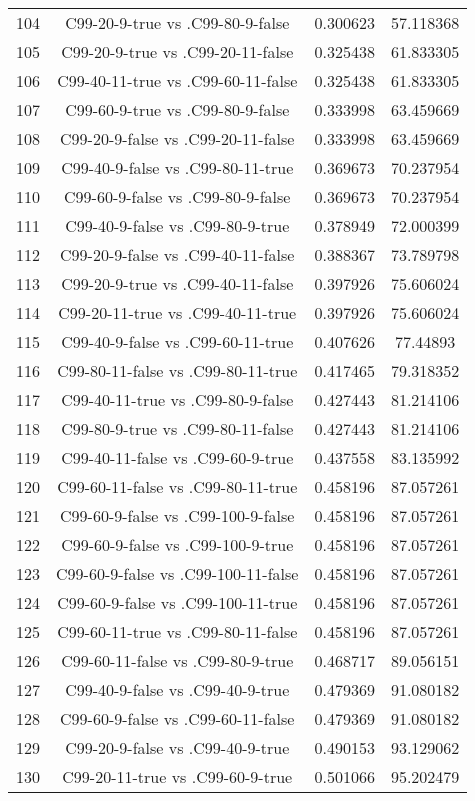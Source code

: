 \documentclass[a4paper,10pt]{article}
\begin{document}
\begin{landscape}
\begin{table}[!htp]
\begin{tabular}{cccc}
104&C99-20-9-true vs .C99-80-9-false&0.300623&57.118368\\
105&C99-20-9-true vs .C99-20-11-false&0.325438&61.833305\\
106&C99-40-11-true vs .C99-60-11-false&0.325438&61.833305\\
107&C99-60-9-true vs .C99-80-9-false&0.333998&63.459669\\
108&C99-20-9-false vs .C99-20-11-false&0.333998&63.459669\\
109&C99-40-9-false vs .C99-80-11-true&0.369673&70.237954\\
110&C99-60-9-false vs .C99-80-9-false&0.369673&70.237954\\
111&C99-40-9-false vs .C99-80-9-true&0.378949&72.000399\\
112&C99-20-9-false vs .C99-40-11-false&0.388367&73.789798\\
113&C99-20-9-true vs .C99-40-11-false&0.397926&75.606024\\
114&C99-20-11-true vs .C99-40-11-true&0.397926&75.606024\\
115&C99-40-9-false vs .C99-60-11-true&0.407626&77.44893\\
116&C99-80-11-false vs .C99-80-11-true&0.417465&79.318352\\
117&C99-40-11-true vs .C99-80-9-false&0.427443&81.214106\\
118&C99-80-9-true vs .C99-80-11-false&0.427443&81.214106\\
119&C99-40-11-false vs .C99-60-9-true&0.437558&83.135992\\
120&C99-60-11-false vs .C99-80-11-true&0.458196&87.057261\\
121&C99-60-9-false vs .C99-100-9-false&0.458196&87.057261\\
122&C99-60-9-false vs .C99-100-9-true&0.458196&87.057261\\
123&C99-60-9-false vs .C99-100-11-false&0.458196&87.057261\\
124&C99-60-9-false vs .C99-100-11-true&0.458196&87.057261\\
125&C99-60-11-true vs .C99-80-11-false&0.458196&87.057261\\
126&C99-60-11-false vs .C99-80-9-true&0.468717&89.056151\\
127&C99-40-9-false vs .C99-40-9-true&0.479369&91.080182\\
128&C99-60-9-false vs .C99-60-11-false&0.479369&91.080182\\
129&C99-20-9-false vs .C99-40-9-true&0.490153&93.129062\\
130&C99-20-11-true vs .C99-60-9-true&0.501066&95.202479\\

\end{tabular}
\end{table}
\end{landscape}
\end{document}
